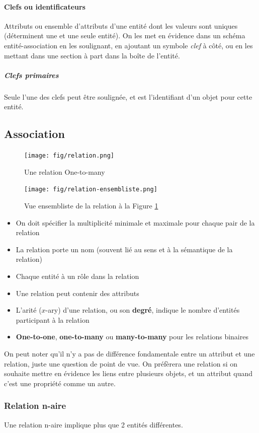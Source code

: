 \documentclass[a4paper]{article}
\begin{document}
\paragraph{Clefs ou identificateurs}
Attributs ou ensemble d'attributs d'une entité dont les valeurs sont uniques
(déterminent une et une seule entité). On les met en évidence dans un schéma
entité-association en les soulignant, en ajoutant un symbole \textit{clef} à côté,
ou en les mettant dans une section à part dans la boîte de l'entité.
\subparagraph{Clefs primaires}
Seule l'une des clefs peut être soulignée, et est l'identifiant d'un objet pour
cette entité.

\subsection{Association}
\begin{figure}[H]
    \center
    \texttt{[image: fig/relation.png]}
    \caption{\label{fig:relation}Une relation One-to-many}
\end{figure}
\begin{figure}[H]
    \center
    \texttt{[image: fig/relation-ensembliste.png]}
    \caption{Vue ensembliste de la relation à la Figure \ref{fig:relation}}
\end{figure}
\begin{itemize}
  \item On doit spécifier la multiplicité minimale et maximale pour chaque pair de la relation
  \item La relation porte un nom (souvent lié au sens et à la sémantique de la relation)
  \item Chaque entité à un rôle dans la relation
  \item Une relation peut contenir des attributs
  \item L'arité ($x$-ary) d'une relation, ou son \textbf{degré}, indique le nombre d'entités participant à la relation
  \item \textbf{One-to-one}, \textbf{one-to-many} ou \textbf{many-to-many} pour les relations binaires
\end{itemize}

On peut noter qu'il n'y a pas de différence fondamentale entre un attribut et une relation,
juste une question de point de vue. On préfèrera une relation si on souhaite mettre en évidence
les liens entre plusieurs objets, et un attribut quand c'est une propriété comme un autre.

\subsubsection{Relation n-aire}
Une relation n-aire implique plus que 2 entités différentes.
\end{document}
